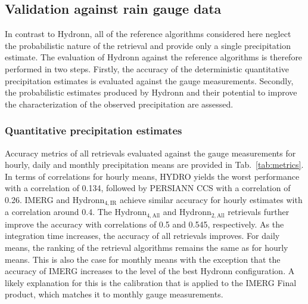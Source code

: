 \documentclass[journal abbreviation, manuscript]{copernicus}
\newcommand{\hydronntwo}{Hydronn$_{2, \text{All}}$}
\newcommand{\hydronnfourall}{Hydronn$_{4, \text{All}}$}
\newcommand{\hydronnfourir}{Hydronn$_{4, \text{IR}}$}
\begin{document}
\subsection{Validation against rain gauge data}

In contrast to Hydronn, all of the reference algorithms considered here neglect
the probabilistic nature of the retrieval and provide only a single
precipitation estimate. The evaluation of Hydronn against the reference
algorithms is therefore performed in two steps. Firstly, the accuracy of the
deterministic quantitative precipitation estimates is evaluated against the
gauge measurements. Secondly,  the probabilistic estimates produced by
Hydronn and their potential to improve the characterization of the
observed precipitation are assessed.

\subsubsection{Quantitative precipitation estimates}

Accuracy metrics of all retrievals evaluated against the gauge measurements for
hourly, daily and monthly precipitation means are provided in
Tab.~\ref{tab:metrics}. In terms of correlations for hourly means, HYDRO yields
the worst performance with a correlation of 0.134, followed by PERSIANN CCS with
a correlation of 0.26. IMERG and \hydronnfourir{} achieve similar accuracy for
hourly estimates with a correlation around 0.4. The \hydronnfourall{} and
\hydronntwo{} retrievals further improve the accuracy with correlations of 0.5
and 0.545, respectively. As the integration time increases, the accuracy of all
retrievals improves. For daily means, the ranking of the retrieval algorithms
remains the same as for hourly means. This is also the case for monthly means
with the exception that the accuracy of IMERG increases to the level of the best
Hydronn configuration. A likely explanation for this is the calibration that is
applied to the IMERG Final product, which matches it to monthly gauge
measurements. 
\end{document}
